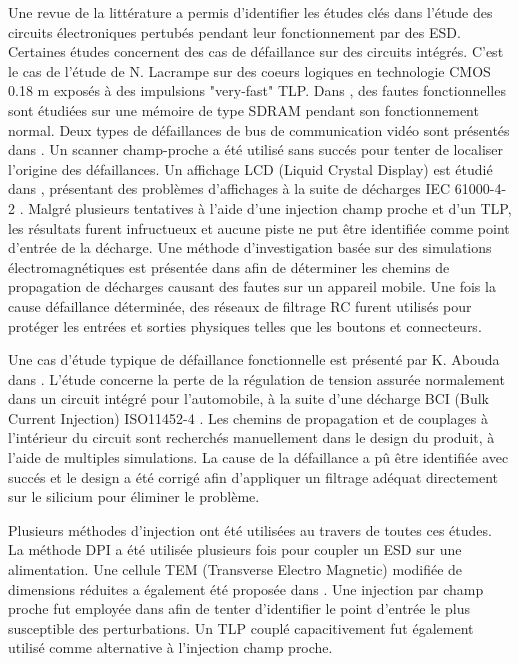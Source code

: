 Une revue de la littérature a permis d'identifier les études clés dans l'étude des circuits électroniques pertubés pendant leur fonctionnement par des ESD.
Certaines études concernent des cas de défaillance sur des circuits intégrés.
C'est le cas de l'étude de N. Lacrampe \cite{LacrampeTransientImmunity} sur des coeurs logiques en technologie CMOS 0.18 \textmu{}m exposés à des impulsions "very-fast" TLP.
Dans \cite{SDRAMCase}, des fautes fonctionnelles sont étudiées sur une mémoire de type SDRAM pendant son fonctionnement normal.
Deux types de défaillances de bus de communication vidéo sont présentés dans \cite{softFailSubsystem}.
Un scanner champ-proche a été utilisé sans succés pour tenter de localiser l'origine des défaillances.
Un affichage LCD (Liquid Crystal Display) est étudié dans \cite{softFailLCD}, présentant des problèmes d'affichages à la suite de décharges IEC 61000-4-2 \cite{iec61000-4-2}.
Malgré plusieurs tentatives à l'aide d'une injection champ proche et d'un TLP, les résultats furent infructueux et aucune piste ne put être identifiée comme point d'entrée de la décharge.
Une méthode d'investigation basée sur des simulations électromagnétiques est présentée dans \cite{softFailMobile} afin de déterminer les chemins de propagation de décharges causant des fautes sur un appareil mobile.
Une fois la cause défaillance déterminée, des réseaux de filtrage RC furent utilisés pour protéger les entrées et sorties physiques telles que les boutons et connecteurs.

Une cas d'étude typique de défaillance fonctionnelle est présenté par K. Abouda dans \cite{softfailEMCIC}.
L'étude concerne la perte de la régulation de tension assurée normalement dans un circuit intégré pour l'automobile, à la suite d'une décharge BCI (Bulk Current Injection) ISO11452-4 \cite{iso11452}.
Les chemins de propagation et de couplages à l'intérieur du circuit sont recherchés manuellement dans le design du produit, à l'aide de multiples simulations.
La cause de la défaillance a pû être identifiée avec succés et le design a été corrigé afin d'appliquer un filtrage adéquat directement sur le silicium pour éliminer le problème.

Plusieurs méthodes d'injection ont été utilisées au travers de toutes ces études.
La méthode DPI \cite{iec62132-4} a été utilisée plusieurs fois pour coupler un ESD sur une alimentation.
Une cellule TEM (Transverse Electro Magnetic) modifiée de dimensions réduites a également été proposée dans \cite{SDRAMCase}.
Une injection par champ proche fut employée dans \cite{softFailLCD} afin de tenter d'identifier le point d'entrée le plus susceptible des perturbations.
Un TLP couplé capacitivement fut également utilisé comme alternative à l'injection champ proche.

